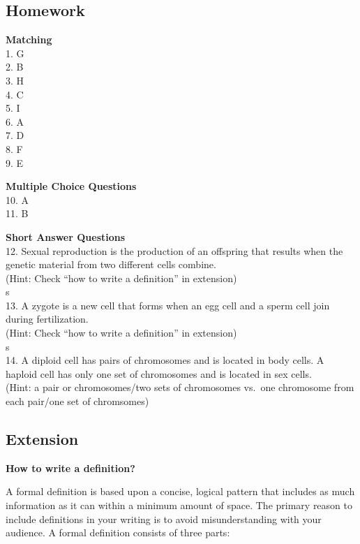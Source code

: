 \documentclass[
]{book}
\begin{document}
\hypertarget{homework}{%
\subsection{Homework}\label{homework}}

\textbf{Matching}\\
1. G\\
2. B\\
3. H\\
4. C\\
5. I\\
6. A\\
7. D\\
8. F\\
9. E

\textbf{Multiple Choice Questions}\\
10. A\\
11. B

\textbf{Short Answer Questions}\\
12. Sexual reproduction is the {production of an offspring} that results when the genetic material from two different cells combine.\\
(Hint: Check ``how to write a definition'' in extension)\\
{s}\\
13. A zygote is {a new cell} that forms when an egg cell and a sperm cell join during fertilization.\\
(Hint: Check ``how to write a definition'' in extension)\\
{s}\\
14. A diploid cell has {pairs of chromosomes} and is located in body cells. A haploid cell has only {one set of chromosomes} and is located in sex cells.\\
(Hint: a pair or chromosomes/two sets of chromosomes vs.~one chromosome from each pair/one set of chromsomes)

\hypertarget{extension}{%
\subsection{Extension}\label{extension}}

\textbf{How to write a definition?}

A formal definition is based upon a concise, logical pattern that includes as much information as it can within a minimum amount of space. The primary reason to include definitions in your writing is to avoid misunderstanding with your audience. A formal definition consists of three parts:
\end{document}

